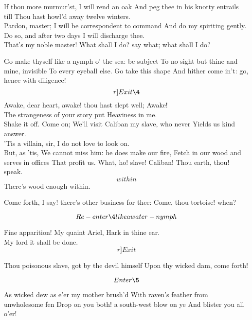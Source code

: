\documentclass[11pt]{book}
\begin{document}
\1	If thou more murmur'st, I will rend an oak
	And peg thee in his knotty entrails till
	Thou hast howl'd away twelve winters. \\

\4	Pardon, master;
	I will be correspondent to command
	And do my spiriting gently. \\

\1	Do so, and after two days
	I will discharge thee. \\

\4	That's my noble master!
	What shall I do? say what; what shall I do?

\1	Go make thyself like a nymph o' the sea: be subject
	To no sight but thine and mine, invisible
	To every eyeball else. Go take this shape
	And hither come in't: go, hence with diligence!
	\[r]Exit \4\]
	Awake, dear heart, awake! thou hast slept well;
   Awake! \\

\2	     The strangeness of your story put
	Heaviness in me. \\

\1	                  Shake it off. Come on;
	We'll visit Caliban my slave, who never
	Yields us kind answer.  \\

\2	'Tis a villain, sir,
	I do not love to look on. \\

\1	But, as 'tis,
	We cannot miss him: he does make our fire,
	Fetch in our wood and serves in offices
	That profit us. What, ho! slave! Caliban!
	Thou earth, thou! speak. \\

\5	\[within\]    There's wood enough within.  

\1	Come forth, I say! there's other business for thee:
	Come, thou tortoise! when?

	\[Re-enter \4 like a water-nymph\]

	Fine apparition! My quaint Ariel,
	Hark in thine ear. \\

\4	                  My lord it shall be done. 	\[r]Exit\]

\1	Thou poisonous slave, got by the devil himself
	Upon thy wicked dam, come forth!

	\[Enter \5\]

\5	As wicked dew as e'er my mother brush'd
	With raven's feather from unwholesome fen
	Drop on you both! a south-west blow on ye
	And blister you all o'er!
\end{document}
